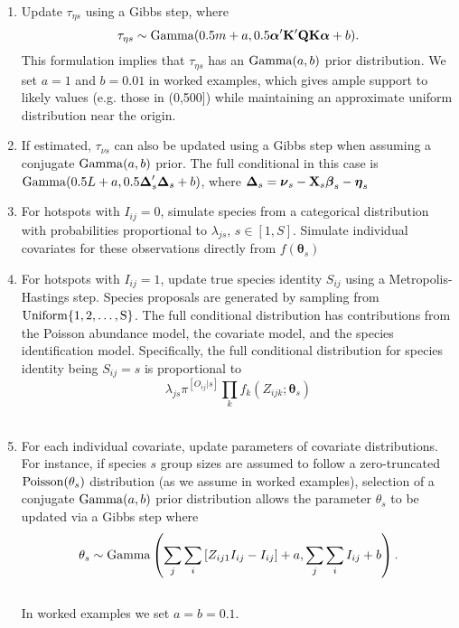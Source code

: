 \documentclass[12pt,fleqn]{article}
\begin{document}
\begin{flushleft}
\begin{enumerate}
  \item Update $\tau_{\eta s}$ using a Gibbs step, where
  \begin{equation*}
  \tau_{\eta s} \sim {\rm Gamma}(0.5m + a,0.5 \boldsymbol{\alpha}^\prime
  {\bf K}^\prime {\bf Q} {\bf K}\boldsymbol{\alpha}+b).
  \end{equation*}
  This formulation implies that $\tau_{\eta s}$ has an ${\rm Gamma}(a,b)$ prior distribution. We set $a=1$ and $b=0.01$ in worked examples, which gives ample support to likely values (e.g. those in (0,500]) while maintaining an approximate uniform distribution near the origin. \\


  \item If estimated, $\tau_{\nu s}$ can also be updated using a Gibbs step when assuming a conjugate
      ${\rm Gamma}(a,b)$ prior.  The full conditional in this case is ${\rm Gamma}(0.5L+a,0.5 \boldsymbol{\Delta}_s^\prime \boldsymbol{\Delta}_s +b)$, where $\boldsymbol{\Delta}_s=\boldsymbol{\nu}_s-{\bf X}_s \boldsymbol{\beta}_s-\boldsymbol{\eta}_s$ \\

  \item For hotspots with $I_{ij}=0$, simulate species from a categorical distribution with probabilities proportional to $\lambda_{js}$, $s \in [1,S]$.  Simulate individual covariates for these observations directly from $f(\boldsymbol{\theta}_s)$ \\

  \item For hotspots with $I_{ij}=1$, update true species identity $S_{ij}$ using a Metropolis-Hastings step.  Species proposals are generated by sampling from $\rm{Uniform}\{1,2,\hdots,S\}$.  The full conditional distribution has contributions from the Poisson abundance model, the covariate model, and the species identification model.  Specifically, the full conditional distribution for species identity being $S_{ij}=s$ is proportional to
      \begin{equation*}
        \lambda_{js} \pi^{[O_{ij}|s]} \prod_k f_k(Z_{ijk} ; \boldsymbol{\theta}_s)
      \end{equation*} \\

  \item For each individual covariate, update parameters of covariate distributions.  For instance, if species $s$ group sizes are assumed to follow a zero-truncated ${\rm Poisson}(\theta_s)$ distribution (as we assume in worked examples), selection of a conjugate ${\rm Gamma}(a,b)$ prior distribution allows the parameter $\theta_s$ to be updated via a Gibbs step where
       \begin{equation*}
       \theta_s \sim {\rm Gamma}\left( \sum_j \sum_i \left[ Z_{ij1} I_{ij} -I_{ij} \right] + a,\sum_j \sum_i I_{ij} + b \right).
       \end{equation*} \\
       In worked examples we set $a=b=0.1$.


\end{enumerate}
\end{flushleft}
\end{document}
